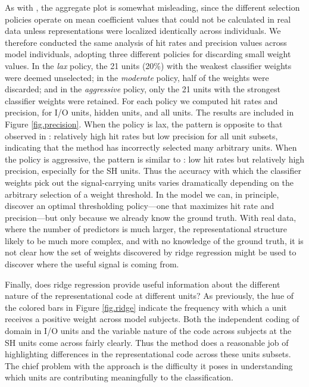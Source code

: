 As with {\lasso}, the aggregate plot is somewhat misleading, since the different selection policies operate on mean coefficient values that could not be calculated in real data unless representations were localized identically across individuals. We therefore conducted the same analysis of hit rates and precision values across model individuals, adopting three different policies for discarding small weight values. In the {\em lax} policy, the 21 units (20\%) with the weakest classifier weights were deemed unselected; in the {\em moderate} policy, half of the weights were discarded; and in the {\em aggressive} policy, only the 21 units with the strongest classifier weights were retained. For each policy we computed hit rates and precision, for I/O units, hidden units, and all units. The results are included in Figure \ref{fig.precision}. When the policy is lax, the pattern is opposite to that observed in {\lasso}: relatively high hit rates but low precision for all unit subsets, indicating that the method has incorrectly selected many arbitrary units. When the policy is aggressive, the pattern is similar to {\lasso}: low hit rates but relatively high precision, especially for the SH units. Thus the accuracy with which the classifier weights pick out the signal-carrying units varies dramatically depending on the arbitrary selection of a weight threshold. In the model we can, in principle, discover an optimal thresholding policy---one that maximizes hit rate and precision---but only because we already know the ground truth. With real data, where the number of predictors is much larger, the representational structure likely to be much more complex, and with no knowledge of the ground truth, it is not clear how the set of weights discovered by ridge regression might be used to discover where the useful signal is coming from.  

Finally, does ridge regression provide useful information about the different nature of the representational code at different units? As previously, the hue of the colored bars in Figure \ref{fig.ridge} indicate the frequency with which a unit receives a positive weight across model subjects. Both the independent coding of domain in I/O units and the variable nature of the code across subjects at the SH units come across fairly clearly. Thus the method does a reasonable job of highlighting differences in the representational code across these units subsets. The chief problem with the approach is the difficulty it poses in understanding which units are contributing meaningfully to the classification. 

